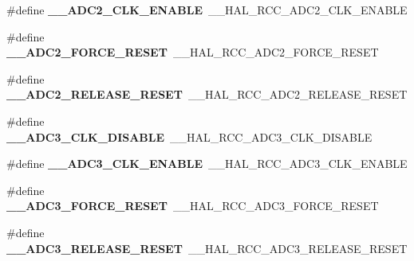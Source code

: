 \begin{DoxyCompactItemize}
\item 
\#define {\bfseries \+\_\+\+\_\+\+A\+D\+C2\+\_\+\+C\+L\+K\+\_\+\+E\+N\+A\+B\+LE}~\+\_\+\+\_\+\+H\+A\+L\+\_\+\+R\+C\+C\+\_\+\+A\+D\+C2\+\_\+\+C\+L\+K\+\_\+\+E\+N\+A\+B\+LE\hypertarget{group___h_a_l___r_c_c___aliased_ga926fc527f079e5e0b3c57b899d32188c}{}\label{group___h_a_l___r_c_c___aliased_ga926fc527f079e5e0b3c57b899d32188c}

\item 
\#define {\bfseries \+\_\+\+\_\+\+A\+D\+C2\+\_\+\+F\+O\+R\+C\+E\+\_\+\+R\+E\+S\+ET}~\+\_\+\+\_\+\+H\+A\+L\+\_\+\+R\+C\+C\+\_\+\+A\+D\+C2\+\_\+\+F\+O\+R\+C\+E\+\_\+\+R\+E\+S\+ET\hypertarget{group___h_a_l___r_c_c___aliased_ga8fff7cb98695cd6db61d658e07b3f7a0}{}\label{group___h_a_l___r_c_c___aliased_ga8fff7cb98695cd6db61d658e07b3f7a0}

\item 
\#define {\bfseries \+\_\+\+\_\+\+A\+D\+C2\+\_\+\+R\+E\+L\+E\+A\+S\+E\+\_\+\+R\+E\+S\+ET}~\+\_\+\+\_\+\+H\+A\+L\+\_\+\+R\+C\+C\+\_\+\+A\+D\+C2\+\_\+\+R\+E\+L\+E\+A\+S\+E\+\_\+\+R\+E\+S\+ET\hypertarget{group___h_a_l___r_c_c___aliased_ga950dedd481bcb1024279b78abc7f80d9}{}\label{group___h_a_l___r_c_c___aliased_ga950dedd481bcb1024279b78abc7f80d9}

\item 
\#define {\bfseries \+\_\+\+\_\+\+A\+D\+C3\+\_\+\+C\+L\+K\+\_\+\+D\+I\+S\+A\+B\+LE}~\+\_\+\+\_\+\+H\+A\+L\+\_\+\+R\+C\+C\+\_\+\+A\+D\+C3\+\_\+\+C\+L\+K\+\_\+\+D\+I\+S\+A\+B\+LE\hypertarget{group___h_a_l___r_c_c___aliased_ga05c6b7d579c500a86114a5e70421e154}{}\label{group___h_a_l___r_c_c___aliased_ga05c6b7d579c500a86114a5e70421e154}

\item 
\#define {\bfseries \+\_\+\+\_\+\+A\+D\+C3\+\_\+\+C\+L\+K\+\_\+\+E\+N\+A\+B\+LE}~\+\_\+\+\_\+\+H\+A\+L\+\_\+\+R\+C\+C\+\_\+\+A\+D\+C3\+\_\+\+C\+L\+K\+\_\+\+E\+N\+A\+B\+LE\hypertarget{group___h_a_l___r_c_c___aliased_ga96ef8d5f9623cc70e65c86d0806e3e86}{}\label{group___h_a_l___r_c_c___aliased_ga96ef8d5f9623cc70e65c86d0806e3e86}

\item 
\#define {\bfseries \+\_\+\+\_\+\+A\+D\+C3\+\_\+\+F\+O\+R\+C\+E\+\_\+\+R\+E\+S\+ET}~\+\_\+\+\_\+\+H\+A\+L\+\_\+\+R\+C\+C\+\_\+\+A\+D\+C3\+\_\+\+F\+O\+R\+C\+E\+\_\+\+R\+E\+S\+ET\hypertarget{group___h_a_l___r_c_c___aliased_gad312edcb949947577c55a2d45a9518ac}{}\label{group___h_a_l___r_c_c___aliased_gad312edcb949947577c55a2d45a9518ac}

\item 
\#define {\bfseries \+\_\+\+\_\+\+A\+D\+C3\+\_\+\+R\+E\+L\+E\+A\+S\+E\+\_\+\+R\+E\+S\+ET}~\+\_\+\+\_\+\+H\+A\+L\+\_\+\+R\+C\+C\+\_\+\+A\+D\+C3\+\_\+\+R\+E\+L\+E\+A\+S\+E\+\_\+\+R\+E\+S\+ET\hypertarget{group___h_a_l___r_c_c___aliased_ga7a8f6b458fbba95a8649e1989b58eaf5}{}\label{group___h_a_l___r_c_c___aliased_ga7a8f6b458fbba95a8649e1989b58eaf5}


\end{DoxyCompactItemize}
